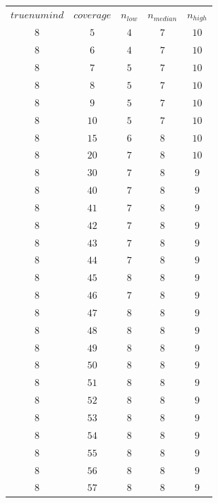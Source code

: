 \begin{table}[H]
\begin{tabular}{ccccc}
$truenumind$ & $coverage$ & $n_{low}$ & $n_{median}$ & $n_{high}$\\
$8$ & $5$ & $4$ & $7$ & $10$\\
$8$ & $6$ & $4$ & $7$ & $10$\\
$8$ & $7$ & $5$ & $7$ & $10$\\
$8$ & $8$ & $5$ & $7$ & $10$\\
$8$ & $9$ & $5$ & $7$ & $10$\\
$8$ & $10$ & $5$ & $7$ & $10$\\
$8$ & $15$ & $6$ & $8$ & $10$\\
$8$ & $20$ & $7$ & $8$ & $10$\\
$8$ & $30$ & $7$ & $8$ & $9$\\
$8$ & $40$ & $7$ & $8$ & $9$\\
$8$ & $41$ & $7$ & $8$ & $9$\\
$8$ & $42$ & $7$ & $8$ & $9$\\
$8$ & $43$ & $7$ & $8$ & $9$\\
$8$ & $44$ & $7$ & $8$ & $9$\\
$8$ & $45$ & $8$ & $8$ & $9$\\
$8$ & $46$ & $7$ & $8$ & $9$\\
$8$ & $47$ & $8$ & $8$ & $9$\\
$8$ & $48$ & $8$ & $8$ & $9$\\
$8$ & $49$ & $8$ & $8$ & $9$\\
$8$ & $50$ & $8$ & $8$ & $9$\\
$8$ & $51$ & $8$ & $8$ & $9$\\
$8$ & $52$ & $8$ & $8$ & $9$\\
$8$ & $53$ & $8$ & $8$ & $9$\\
$8$ & $54$ & $8$ & $8$ & $9$\\
$8$ & $55$ & $8$ & $8$ & $9$\\
$8$ & $56$ & $8$ & $8$ & $9$\\
$8$ & $57$ & $8$ & $8$ & $9$\\
\end{tabular}
\end{table}
 